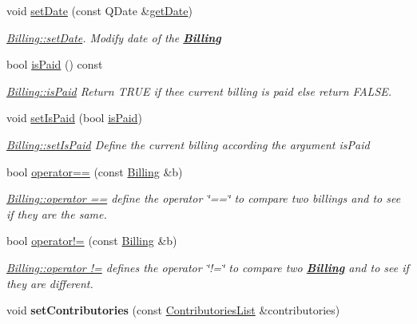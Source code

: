 \begin{DoxyCompactItemize}
void \hyperlink{classModels_1_1Billing_ae8db0fe5fe273fad31e2f846b5b891cb}{set\-Date} (const Q\-Date \&\hyperlink{classModels_1_1Billing_af0d1f0132d0902fb96456d0a9018b701}{get\-Date})
\begin{DoxyCompactList}\small\item\em \hyperlink{classModels_1_1Billing_ae8db0fe5fe273fad31e2f846b5b891cb}{Billing\-::set\-Date}. Modify {\itshape date} of the {\bfseries \hyperlink{classModels_1_1Billing}{Billing}} \end{DoxyCompactList}\item 
bool \hyperlink{classModels_1_1Billing_ab2f9bd62e920be8c68313e35bbcabd46}{is\-Paid} () const 
\begin{DoxyCompactList}\small\item\em \hyperlink{classModels_1_1Billing_ab2f9bd62e920be8c68313e35bbcabd46}{Billing\-::is\-Paid} Return T\-R\-U\-E if thee current billing is paid else return F\-A\-L\-S\-E. \end{DoxyCompactList}\item 
void \hyperlink{classModels_1_1Billing_a99cf8c1b7435fe268b8fa9257cad6c56}{set\-Is\-Paid} (bool \hyperlink{classModels_1_1Billing_ab2f9bd62e920be8c68313e35bbcabd46}{is\-Paid})
\begin{DoxyCompactList}\small\item\em \hyperlink{classModels_1_1Billing_a99cf8c1b7435fe268b8fa9257cad6c56}{Billing\-::set\-Is\-Paid} Define the current billing according the argument {\itshape is\-Paid} \end{DoxyCompactList}\item 
bool \hyperlink{classModels_1_1Billing_af3d8818a1e00eaa707058567fccf045b}{operator==} (const \hyperlink{classModels_1_1Billing}{Billing} \&b)
\begin{DoxyCompactList}\small\item\em \hyperlink{classModels_1_1Billing_af3d8818a1e00eaa707058567fccf045b}{Billing\-::operator ==} define the operator \char`\"{}==\char`\"{} to compare two billings and to see if they are the same. \end{DoxyCompactList}\item 
bool \hyperlink{classModels_1_1Billing_ae6ff88e05384718d57be1be38f250a52}{operator!=} (const \hyperlink{classModels_1_1Billing}{Billing} \&b)
\begin{DoxyCompactList}\small\item\em \hyperlink{classModels_1_1Billing_ae6ff88e05384718d57be1be38f250a52}{Billing\-::operator !=} defines the operator \char`\"{}!=\char`\"{} to compare two {\bfseries \hyperlink{classModels_1_1Billing}{Billing}} and to see if they are different. \end{DoxyCompactList}\item 
\hypertarget{classModels_1_1Billing_acb836caf7aef8e953c432661cb8aa55f}{void {\bfseries set\-Contributories} (const \hyperlink{classModels_1_1ContributoriesList}{Contributories\-List} \&contributories)}\label{classModels_1_1Billing_acb836caf7aef8e953c432661cb8aa55f}


\end{DoxyCompactItemize}
